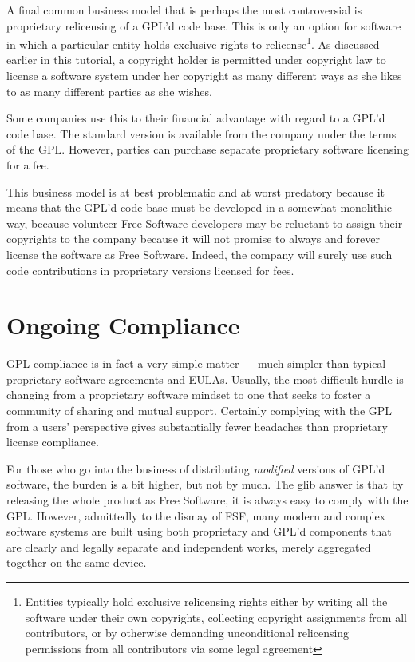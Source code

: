 \medskip

\label{Proprietary Relicensing}

A final common business model that is perhaps the most controversial is
proprietary relicensing of a GPL'd code base. This is only an option for
software in which a particular entity holds exclusive rights to
relicense\footnote{Entities typically hold exclusive relicensing rights
  either by writing all the software under their own copyrights, collecting
  copyright assignments from all contributors, or by otherwise demanding
  unconditional relicensing permissions from all contributors via some legal
  agreement}. As discussed earlier in this tutorial, a copyright holder is
permitted under copyright law to license a software system under her
copyright as many different ways as she likes to as many different parties as
she wishes.

Some companies use this to their
financial advantage with regard to a GPL'd code base. The standard
version is available from the company under the terms of the GPL\@.
However, parties can purchase separate proprietary software licensing for
a fee.

This business model is at best problematic and at worst predatory because it means that the GPL'd code
base must be developed in a somewhat monolithic way, because volunteer
Free Software developers may be reluctant to assign their copyrights to
the company because it will not promise to always and forever license the
software as Free Software. Indeed, the company will surely use such code
contributions in proprietary versions licensed for fees.

\section{Ongoing Compliance}

GPL compliance is in fact a very simple matter --- much simpler than
typical proprietary software agreements and EULAs. Usually, the most
difficult hurdle is changing from a proprietary software mindset to one
that seeks to foster a community of sharing and mutual support. Certainly
complying with the GPL from a users' perspective gives substantially fewer
headaches than proprietary license compliance.

For those who go into the business of distributing {\em modified}
versions of GPL'd software, the burden is a bit higher, but not by
much. The glib answer is that by releasing the whole product as Free
Software, it is always easy to comply with the GPL. However,
admittedly to the dismay of FSF, many modern and complex software
systems are built using both proprietary and GPL'd components that are
clearly and legally separate and independent works, merely aggregated
together on the same device.

